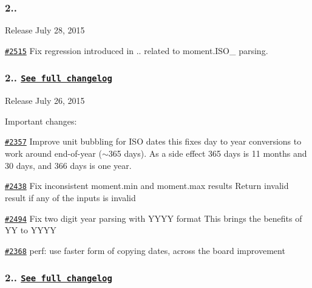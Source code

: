 \subsubsection*{2..}


\begin{DoxyItemize}
\item Release July 28, 2015
\end{DoxyItemize}

\href{https://github.com/moment/moment/pull/2515}{\tt \#2515} Fix regression introduced in {..} related to {\ttfamily moment.\+I\+S\+O\+\_} parsing.

\subsubsection*{2.. \href{https://gist.github.com/ichernev/6ec13ac7efc396da44b2}{\tt See full changelog}}


\begin{DoxyItemize}
\item Release July 26, 2015
\end{DoxyItemize}

Important changes\+:
\begin{DoxyItemize}
\item \href{https://github.com/moment/moment/pull/2357}{\tt \#2357} Improve unit bubbling for I\+SO dates this fixes day to year conversions to work around end-\/of-\/year ($\sim$365 days). As a side effect 365 days is 11 months and 30 days, and 366 days is one year.
\item \href{https://github.com/moment/moment/pull/2438}{\tt \#2438} Fix inconsistent moment.\+min and moment.\+max results Return invalid result if any of the inputs is invalid
\item \href{https://github.com/moment/moment/pull/2494}{\tt \#2494} Fix two digit year parsing with Y\+Y\+YY format This brings the benefits of YY to Y\+Y\+YY
\item \href{https://github.com/moment/moment/pull/2368}{\tt \#2368} perf\+: use faster form of copying dates, across the board improvement
\end{DoxyItemize}

\subsubsection*{2.. \href{https://gist.github.com/ichernev/f264b9bed5b00f8b1b7f}{\tt See full changelog}}


